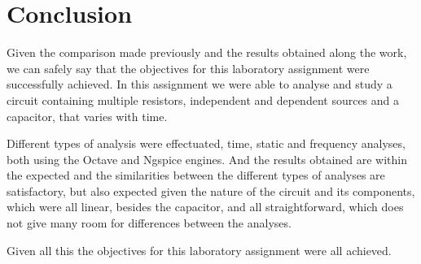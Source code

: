 \section{Conclusion}
\label{sec:conclusion}
Given the comparison made previously and the results obtained along the work, we can safely say that the objectives for this laboratory assignment were successfully achieved. In this assignment we were able to analyse and study a circuit containing multiple resistors, independent and dependent sources and a capacitor, that varies with time.\par
Different types of analysis were effectuated, time, static and frequency analyses, both using the Octave and Ngspice engines. And the results obtained are within the expected and the similarities between the different types of analyses are satisfactory, but also expected given the nature of the circuit and its components, which were all linear, besides the capacitor, and all straightforward, which does not give many room for differences between the analyses.\par
Given all this the objectives for this laboratory assignment were all achieved.

